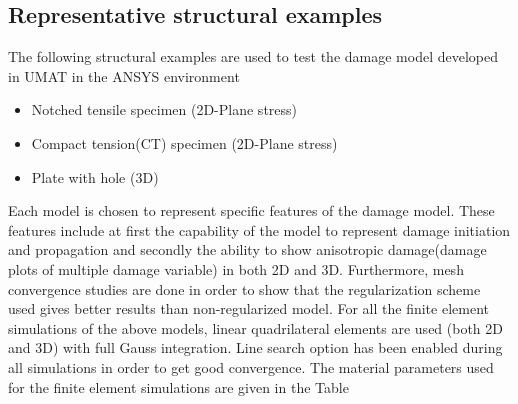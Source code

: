 \documentclass[a4paper,12pt]{extarticle}
\begin{document}
\subsection{Representative structural examples}
\indent\indent\indent The following structural examples are used to test the damage model developed in UMAT in the ANSYS environment
\begin{itemize}
\item Notched tensile specimen (2D-Plane stress)
\item Compact tension(CT) specimen (2D-Plane stress)
\item Plate with hole (3D)
\end{itemize}
Each model is chosen to represent specific features of the damage model. These features include at first the capability of the model to represent damage initiation and propagation and secondly the ability to show anisotropic damage(damage plots of multiple damage variable) in both 2D and 3D. Furthermore, mesh convergence studies are done in order to show that the regularization scheme used gives better results than non-regularized model. For all the finite element simulations of the above models, linear quadrilateral elements are used (both 2D and 3D) with full Gauss integration. Line search option has been enabled during all simulations in order to get good convergence. The material parameters used for the finite element simulations are given in the Table 
\end{document}
